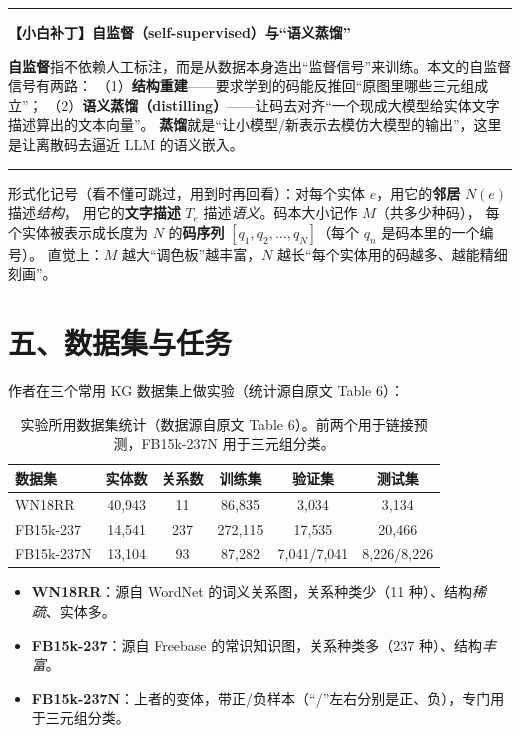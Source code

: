 \documentclass[11pt,UTF8,fontset=fandol]{ctexart}
\newenvironment{tip}[1]{%
  \par\smallskip\noindent\rule{\linewidth}{0.4pt}\par\nobreak
  \noindent\textbf{【小白补丁】#1}\par\nobreak\noindent\ignorespaces
}{%
  \par\noindent\rule{\linewidth}{0.4pt}\par\smallskip
}
\begin{document}
\begin{tip}{自监督（self-supervised）与“语义蒸馏”}
\textbf{自监督}指不依赖人工标注，而是从数据本身造出“监督信号”来训练。本文的自监督信号有两路：
（1）\textbf{结构重建}——要求学到的码能反推回“原图里哪些三元组成立”；
（2）\textbf{语义蒸馏（distilling）}——让码去对齐“一个现成大模型给实体文字描述算出的文本向量”。
\textbf{蒸馏}就是“让小模型/新表示去模仿大模型的输出”，这里是让离散码去逼近 LLM 的语义嵌入。
\end{tip}

形式化记号（看不懂可跳过，用到时再回看）：对每个实体 $e$，用它的\textbf{邻居} $N(e)$ 描述\emph{结构}，
用它的\textbf{文字描述} $T_e$ 描述\emph{语义}。码本大小记作 $M$（共多少种码），
每个实体被表示成长度为 $N$ 的\textbf{码序列} $[q_1,q_2,\dots,q_N]$（每个 $q_n$ 是码本里的一个编号）。
直觉上：$M$ 越大“调色板”越丰富，$N$ 越长“每个实体用的码越多、越能精细刻画”。

\section{五、数据集与任务}

作者在三个常用 KG 数据集上做实验（统计源自原文 Table 6）：

\begin{table}[H]\centering
\caption{实验所用数据集统计（数据源自原文 Table 6）。前两个用于链接预测，FB15k-237N 用于三元组分类。}
\begin{tabular}{lccccc}
\toprule
数据集 & 实体数 & 关系数 & 训练集 & 验证集 & 测试集 \\
\midrule
WN18RR & 40{,}943 & 11 & 86{,}835 & 3{,}034 & 3{,}134 \\
FB15k-237 & 14{,}541 & 237 & 272{,}115 & 17{,}535 & 20{,}466 \\
FB15k-237N & 13{,}104 & 93 & 87{,}282 & 7{,}041/7{,}041 & 8{,}226/8{,}226 \\
\bottomrule
\end{tabular}
\end{table}

\begin{itemize}[leftmargin=2em]
  \item \textbf{WN18RR}：源自 WordNet 的词义关系图，关系种类少（11 种）、结构\emph{稀疏}、实体多。
  \item \textbf{FB15k-237}：源自 Freebase 的常识知识图，关系种类多（237 种）、结构\emph{丰富}。
  \item \textbf{FB15k-237N}：上者的变体，带正/负样本（“/”左右分别是正、负），专门用于三元组分类。
\end{itemize}
\end{document}
